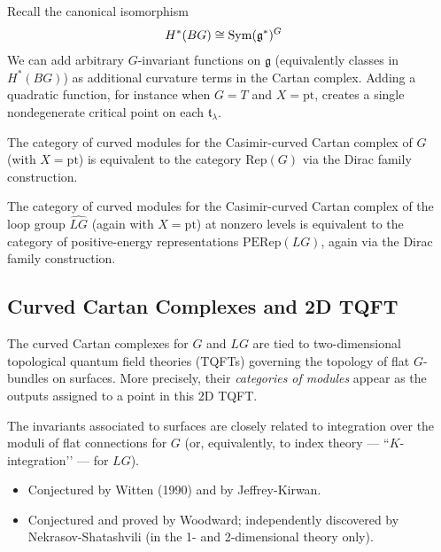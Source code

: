 \documentclass[12pt]{article}
\begin{document}
\begin{example}
    Recall the canonical isomorphism \begin{align*}
        H^*(BG) &\cong \operatorname{Sym}(\mathfrak g^*)^{G}
    \end{align*}
We can add arbitrary $G$-invariant functions on $\mathfrak g$ (equivalently classes in $H^*(BG)$) as additional curvature terms in the Cartan complex. Adding a quadratic function, for instance when $G = T$ and $X = \mathrm{pt}$,
creates a single nondegenerate critical point on each $\mathfrak t_\lambda$.
\end{example}

\begin{theorem}
The category of curved modules for the Casimir-curved Cartan complex of $G$
(with $X = \mathrm{pt}$) is equivalent to the category $\mathrm{Rep}(G)$ via the Dirac family construction.
\end{theorem}

\begin{theorem}
The category of curved modules for the Casimir-curved Cartan complex
of the loop group $\widehat{LG}$ (again with $X = \mathrm{pt}$)
at nonzero levels
is equivalent to the category of positive-energy representations
$\mathrm{PERep}(LG)$,
again via the Dirac family construction.
\end{theorem}


\subsection{Curved Cartan Complexes and 2D TQFT}

The curved Cartan complexes for $G$ and $LG$ are tied to
two-dimensional topological quantum field theories (TQFTs)
governing the topology of flat $G$-bundles on surfaces. More precisely, their \emph{categories of modules} appear as the
outputs assigned to a point in this 2D TQFT.

\medskip
The invariants associated to surfaces are closely related to
integration over the moduli of flat connections for $G$
(or, equivalently, to index theory --- ``$K$-integration’’ --- for $LG$).

\begin{itemize}
    \item[(i)] Conjectured by Witten (1990) and by Jeffrey-Kirwan.
    \item[(ii)] Conjectured and proved by Woodward; independently discovered by
    Nekrasov-Shatashvili (in the 1- and 2-dimensional theory only).
\end{itemize}
\end{document}
